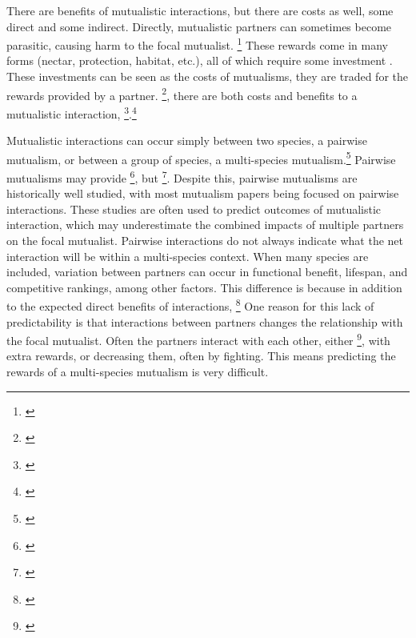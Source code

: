 \documentclass[12pt,a4paper]{article}
\newcommand{\tom}[2]{{\color{red}{#1}}\footnote{\textit{\color{red}{#2}}}}
\begin{document}
There are benefits of mutualistic interactions, but there are costs as well, some direct and some indirect. 
Directly, mutualistic partners can sometimes become parasitic, causing harm to the focal mutualist\cite{Bronstein2001a}. 
\tom{More indirectly, these interactions require energy.}{Awkward sentence, and I'm not sure why investment is reward is an indirect cost.} 
These rewards come in many forms (nectar, protection, habitat, etc.), all of which require some investment \cite{Bronstein2001}. 
These investments can be seen as the costs of mutualisms, they are traded for the rewards provided by a partner. 
\tom{Because of these trade-offs}{trade-offs between what and what?}, there are both costs and benefits to a mutualistic interaction\cite{Bronstein2001,Bronstein2001a}, \tom{particularly as the mutualism becomes more complex in the context of its environment}{I don't know what this means.}.\tom{}{Having made it to the end of this paragraph I can't really find any new information here. You are covering very basic aspects of mutualism that were already described in the first paragraph. I would get to the question/problem at the core of this paper more quickly.} 

Mutualistic interactions can occur simply between two species, a pairwise mutualism, or between a group of species, a multi-species mutualism\cite{Stanton2013}.\tom{}{Technically all mutualisms are pairwise (++) but they can be combined into many pairs.} 
Pairwise mutualisms may provide \tom{benefits of efficiency in the context of mutualisms}{I don't know what this means}, but \tom{they are not a good investment due to temporal and spatial variation}{Variation in what?}\cite{Waser1996}. 
Despite this, pairwise mutualisms are historically well studied, with most mutualism papers being focused on pairwise interactions. 
These studies are often used to predict outcomes of mutualistic interaction, which may underestimate the combined impacts of multiple partners on the focal mutualist\cite{Stanton2013,Palmer2010}. 
Pairwise interactions do not always indicate what the net interaction will be within a multi-species context\cite{Chamberlain2014,Song2020}. 
When many species are included, variation between partners can occur in functional benefit, lifespan, and competitive rankings, among other factors\cite{Stanton2013}. 
This difference is because in addition to the expected direct benefits of interactions, \tom{they can also indirectly impact the focal mutualist through other partner interactions. }{Again, I would avoid too much discussion of interaction between partners. You don't need interactions between partners to have non-additive effects, and you are priming readers to expect something that the manuscript does not deliver.}
One reason for this lack of predictability is that interactions between partners changes the relationship with the focal mutualist\cite{Afkhami2014}.  
Often the partners interact with each other, either \tom{increasing their performances}{awkward}, with extra rewards, or decreasing them, often by fighting\cite{Boucher1982}. 
This means predicting the rewards of a multi-species mutualism is very difficult. 
\end{document}
